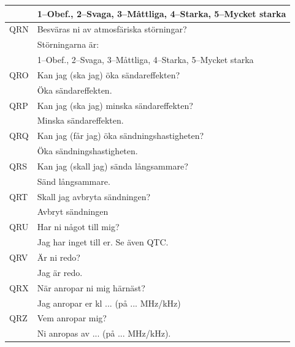 \begin{longtable}{ll}
	    & 1--Obef., 2--Svaga, 3--Måttliga, 4--Starka, 5--Mycket starka         \\ \hline
	QRN & Besväras ni av atmosfäriska störningar?                              \\
	    & Störningarna är:                                                     \\
	    & 1--Obef., 2--Svaga, 3--Måttliga, 4--Starka, 5--Mycket starka         \\ \hline
	QRO & Kan jag (ska jag) öka sändareffekten?                                \\
	    & Öka sändareffekten.                                                  \\ \hline
	QRP & Kan jag (ska jag) minska sändareffekten?                             \\
	    & Minska sändareffekten.                                               \\ \hline
	QRQ & Kan jag (får jag) öka sändningshastigheten?                          \\
	    & Öka sändningshastigheten.                                            \\ \hline
	QRS & Kan jag (skall jag) sända långsammare?                               \\
	    & Sänd långsammare.                                                    \\ \hline
	QRT & Skall jag avbryta sändningen?                                        \\
	    & Avbryt sändningen                                                    \\ \hline
	QRU & Har ni något till mig?                                               \\
	    & Jag har inget till er. Se även QTC.                                  \\ \hline
	QRV & Är ni redo?                                                          \\
	    & Jag är redo.                                                         \\ \hline
	QRX & När anropar ni mig härnäst?                                          \\
	    & Jag anropar er kl ... (på ... MHz/kHz)                               \\ \hline
	QRZ & Vem anropar mig?                                                     \\
	    & Ni anropas av ... (på ... MHz/kHz).                                  \\ \hline

\end{longtable}
